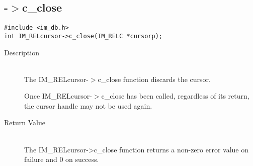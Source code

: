 \newpage
\subsection{{\IMRELcursor}-$>$c\_close}
\begin{verbatim}
#include <im_db.h>
int IM_RELcursor->c_close(IM_RELC *cursorp);
\end{verbatim}
\begin{description}
\item[Description]\ \\

  The IM\_RELcursor-$>$c\_close function discards the cursor. 

  Once IM\_RELcursor-$>$c\_close has been called, regardless of its
  return, the cursor handle may not be used again. 

\item[Return Value]\ \\
  The IM\_RELcursor->c\_close function returns a non-zero error value
  on failure and 0 on success.
\end{description}

\newpage
